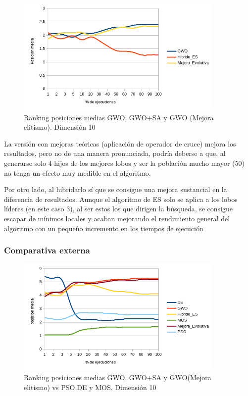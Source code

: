 \documentclass[a4paper]{report}
\begin{document}
\begin{figure}[H]
    \centering
    \caption{Ranking posiciones medias GWO, GWO+SA y GWO (Mejora elitismo). Dimensión 10}
    \includegraphics[width=0.9\textwidth]{Resultados/Analisis_final/D10/GWO/Grafico_puestos.png}

\end{figure}

La versión con mejoras teóricas (aplicación de operador de cruce) mejora los resultados, pero no de una manera pronunciada, podría deberse a que, al generarse solo 4 hijos de los mejores lobos y ser la población mucho mayor (50) no tenga un efecto muy medible en el algoritmo.

Por otro lado, al hibridarlo sí que se consigue una mejora sustancial en la diferencia de resultados. Aunque el algoritmo de ES solo se aplica a los lobos líderes (en este caso 3), al ser estos los que dirigen la búsqueda, se consigue escapar de mínimos locales y acaban mejorando el rendimiento general del algoritmo con un pequeño incremento en los tiempos de ejecución




\subsubsection{Comparativa externa}






\begin{figure}[H]
    \centering
    \caption{Ranking posiciones medias GWO, GWO+SA y GWO(Mejora elitismo) vs PSO,DE y MOS. Dimensión 10}
    \includegraphics[width=0.9\textwidth]{Resultados/Analisis_final/D10/Todos/Grafico_puestos.png}

\end{figure}
\end{document}
